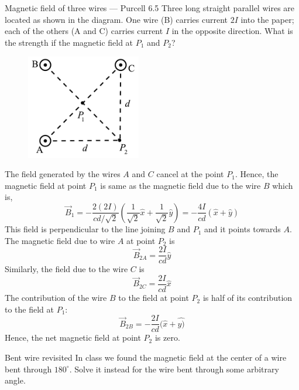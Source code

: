 \documentclass[makesolutionspdf]{esg8022pset}
\begin{document}
\begin{problem}{Magnetic field of three wires --- Purcell 6.5}
  Three long straight parallel wires are located as shown in the diagram. One
  wire (B) carries current $2 I$ into the paper; each of the others (A and C)
  carries current $I$ in the opposite direction. What is the strength if the
  magnetic field at $P_1$ and $P_{2}$?
  \begin{figure}[H]
    \centering
    \includegraphics[width = 5cm]{Threewires}
  \end{figure}
\end{problem}

\begin{solution}
  The field generated by the wires $A$ and $C$ cancel at the point $P_{1}$.
  Hence, the magnetic field at point $P_{1}$ is same as the magnetic field due
  to the wire $B$ which is,
  $$\vec{B}_{1} = -\frac{2 (2I)}{ c d/\sqrt{2}} \left( \frac{1}{\sqrt{2} } \hat{x}+\frac{1}{\sqrt{2} } \hat{y} \right) = -\frac{4I}{cd} ( \hat{x} +  \hat{y})$$
  This field is perpendicular to the line joining $B$ and $P_{1}$ and it points
  towards $A$.\\
  \noindent  The magnetic field due to wire $A$ at point $P_{2}$ is
  $$\vec{B}_{2A} =\frac {2 I}{cd}  \hat{y}$$
  Similarly, the field due to the wire $C$ is
  $$\vec{B}_{2C} = \frac{2 I}{cd}  \hat{x}$$
  The contribution of the wire $B$ to the field at point $P_{2}$ is half of its contribution to the field at $P_{1}$: 
  $$\vec{B}_{2B} =  -\frac{2I}{cd} ( \hat{x} +  \hat{y)}$$
  Hence, the net magnetic field at point $P_{2}$ is zero.
\end{solution}





\begin{problem}{Bent wire revisited}
  In class we found the magnetic field at the center of a wire bent through
  $180^\circ$.  Solve it instead for the wire bent through some arbitrary
  angle.
\end{problem}
\end{document}
